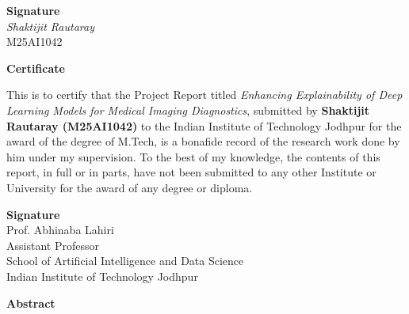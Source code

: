 \documentclass[12pt,a4paper]{report}
\begin{document}
\vspace{3cm}
\begin{flushright}
\textbf{Signature}\\
\textit{Shaktijit Rautaray}\\
M25AI1042
\end{flushright}

\newpage
\thispagestyle{empty}
\begin{flushright}
\textbf{Certificate}
\end{flushright}
\vspace{1cm}

This is to certify that the Project Report titled \textit{Enhancing Explainability of Deep Learning Models for Medical Imaging Diagnostics}, submitted by \textbf{Shaktijit Rautaray (M25AI1042)} to the Indian Institute of Technology Jodhpur for the award of the degree of M.Tech, is a bonafide record of the research work done by him under my supervision. To the best of my knowledge, the contents of this report, in full or in parts, have not been submitted to any other Institute or University for the award of any degree or diploma.

\vspace{3cm}
\begin{flushright}
\textbf{Signature}\\
Prof. Abhinaba Lahiri\\
Assistant Professor\\
School of Artificial Intelligence and Data Science\\
Indian Institute of Technology Jodhpur
\end{flushright}

\newpage
{}
\begin{flushright}
\textbf{Abstract}
\end{flushright}
\vspace{0.5cm}
\end{document}
